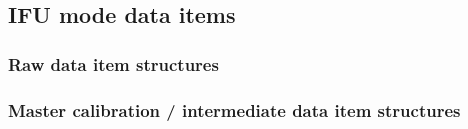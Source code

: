 \subsection{IFU mode data items}\label{ssec:lms_drl_items_structures}

\subsubsection{Raw data item structures}\label{sssec:lmsrawdatastructs}






















\subsubsection{Master calibration / intermediate data item structures}\label{sssec:lmsprocdatastructs}











